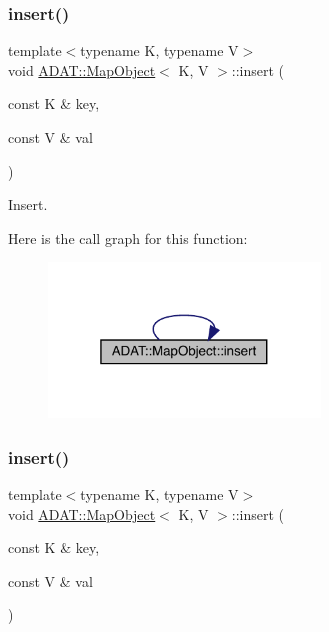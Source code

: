 \subsubsection{\texorpdfstring{insert()}{insert()}\hspace{0.1cm}{\footnotesize\ttfamily [2/9]}}
{\footnotesize\ttfamily template$<$typename K, typename V$>$ \\
void \mbox{\hyperlink{classADAT_1_1MapObject}{A\+D\+A\+T\+::\+Map\+Object}}$<$ K, V $>$\+::insert (\begin{DoxyParamCaption}\item[{const K \&}]{key,  }\item[{const V \&}]{val }\end{DoxyParamCaption})\hspace{0.3cm}{\ttfamily [inline]}}



Insert. 

Here is the call graph for this function\+:
\nopagebreak
\begin{figure}[H]
\begin{center}
\leavevmode
\includegraphics[width=205pt]{da/d29/classADAT_1_1MapObject_a5389738841dca1228aefe6935c464a78_cgraph}
\end{center}
\end{figure}
\mbox{\label{classADAT_1_1MapObject_a5389738841dca1228aefe6935c464a78}} 
\subsubsection{\texorpdfstring{insert()}{insert()}\hspace{0.1cm}{\footnotesize\ttfamily [3/9]}}
{\footnotesize\ttfamily template$<$typename K, typename V$>$ \\
void \mbox{\hyperlink{classADAT_1_1MapObject}{A\+D\+A\+T\+::\+Map\+Object}}$<$ K, V $>$\+::insert (\begin{DoxyParamCaption}\item[{const K \&}]{key,  }\item[{const V \&}]{val }\end{DoxyParamCaption})\hspace{0.3cm}{\ttfamily [inline]}}



